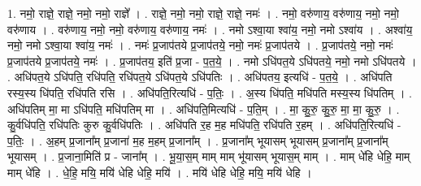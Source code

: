 \documentclass[17pt]{extarticle}
\begin{document}
1. नमो॒ राज्ञे॒ राज्ञे॒ नमो॒ नमो॒ राज्ञे᳚ । . राज्ञे॒ नमो॒ नमो॒ राज्ञे॒ राज्ञे॒ नमः॑ । . नमो॒ वरु॑णाय॒ वरु॑णाय॒ नमो॒ नमो॒ वरु॑णाय । . वरु॑णाय॒ नमो॒ नमो॒ वरु॑णाय॒ वरु॑णाय॒ नमः॑ । . नमो ऽश्वा॒या श्वा॑य॒ नमो॒ नमो ऽश्वा॑य । . अश्वा॑य॒ नमो॒ नमो ऽश्वा॒या श्वा॑य॒ नमः॑ । . नमः॑ प्र॒जाप॑तये प्र॒जाप॑तये॒ नमो॒ नमः॑ प्र॒जाप॑तये । . प्र॒जाप॑तये॒ नमो॒ नमः॑ प्र॒जाप॑तये प्र॒जाप॑तये॒ नमः॑ । . प्र॒जाप॑तय॒ इति॑ प्र॒जा - प॒त॒ये॒ । . नमो ऽधि॑पत॒ये ऽधि॑पतये॒ नमो॒ नमो ऽधि॑पतये । . अधि॑पत॒ये ऽधि॑पति॒ रधि॑पति॒ रधि॑पत॒ये ऽधि॑पत॒ये ऽधि॑पतिः । . अधि॑पतय॒ इत्यधि॑ - प॒त॒ये॒ । . अधि॑पति रस्य॒स्य धि॑पति॒ रधि॑पति रसि । . अधि॑पति॒रित्यधि॑ - प॒तिः॒ । . अ॒स्य धि॑पति॒ मधि॑पति मस्य॒स्य धि॑पतिम् । . अधि॑पतिम् मा॒ मा ऽधि॑पति॒ मधि॑पतिम् मा । . अधि॑पति॒मित्यधि॑ - प॒ति॒म् । . मा॒ कु॒रु॒ कु॒रु॒ मा॒ मा॒ कु॒रु॒ । . कु॒र्वधि॑पति॒ रधि॑पतिः कुरु कु॒र्वधि॑पतिः । . अधि॑पति र॒ह म॒ह मधि॑पति॒ रधि॑पति र॒हम् । . अधि॑पति॒रित्यधि॑ - प॒तिः॒ । . अ॒हम् प्र॒जाना᳚म् प्र॒जाना॑ म॒ह म॒हम् प्र॒जाना᳚म् । . प्र॒जाना᳚म् भूयासम् भूयासम् प्र॒जाना᳚म् प्र॒जाना᳚म् भूयासम् । . प्र॒जाना॒मिति॑ प्र - जाना᳚म् । . भू॒या॒स॒म् माम् माम् भू॑यासम् भूयास॒म् माम् । . माम् धे॑हि धेहि॒ माम् माम् धे॑हि । . धे॒हि॒ मयि॒ मयि॑ धेहि धेहि॒ मयि॑ । . मयि॑ धेहि धेहि॒ मयि॒ मयि॑ धेहि । \newline
\end{document}
